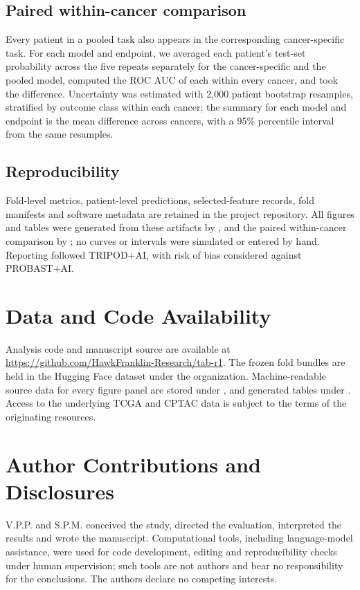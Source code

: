 \documentclass[11pt, a4paper, onecolumn, confidential, copyright]{hawkfranklin}
\begin{document}
\subsection{Paired within-cancer comparison}

Every patient in a pooled task also appears in the corresponding cancer-specific task. For each model and endpoint, we averaged each patient's test-set probability across the five repeats separately for the cancer-specific and the pooled model, computed the ROC AUC of each within every cancer, and took the difference. Uncertainty was estimated with 2,000 patient bootstrap resamples, stratified by outcome class within each cancer; the summary for each model and endpoint is the mean difference across cancers, with a 95\% percentile interval from the same resamples.

\subsection{Reproducibility}

Fold-level metrics, patient-level predictions, selected-feature records, fold manifests and software metadata are retained in the project repository. All figures and tables were generated from these artifacts by , and the paired within-cancer comparison by ; no curves or intervals were simulated or entered by hand. Reporting followed TRIPOD+AI, with risk of bias considered against PROBAST+AI.\citep{tripodai2024,probastai2024}

\section{Data and Code Availability}

Analysis code and manuscript source are available at \url{https://github.com/HawkFranklin-Research/tab-r1}. The frozen fold bundles are held in the Hugging Face dataset  under the  organization. Machine-readable source data for every figure panel are stored under , and generated tables under . Access to the underlying TCGA and CPTAC data is subject to the terms of the originating resources.

\section{Author Contributions and Disclosures}

V.P.P. and S.P.M. conceived the study, directed the evaluation, interpreted the results and wrote the manuscript. Computational tools, including language-model assistance, were used for code development, editing and reproducibility checks under human supervision; such tools are not authors and bear no responsibility for the conclusions. The authors declare no competing interests.


\end{document}
